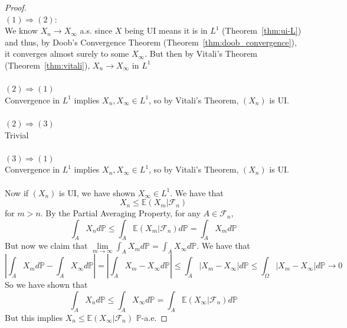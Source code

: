 \documentclass[11pt,a4paper]{article}
\theoremstyle{definition}
\begin{document}
\begin{proof}
~\\ $(1) \Longrightarrow (2)$: ~\\
    We know $X_n \to X_\infty$ a.s. since $X$ being UI means it is in $L^1$ (Theorem~\ref{thm:ui-L}) and thus, by Doob's Convergence Theorem (Theorem~\ref{thm:doob_convergence}), it converges almost surely to some $X_\infty$. But then by Vitali's Theorem (Theorem~\ref{thm:vitali}), $X_n \to X_\infty$ in $L^1$
    ~\\~\\ $(2) \Longrightarrow (1)$ ~\\
    Convergence in $L^1$ implies $X_n, X_\infty \in L^1$, so by Vitali's Theorem, $(X_n)$ is UI.
    ~\\~\\ $(2) \Longrightarrow (3)$ ~\\
    Trivial
    ~\\~\\ $(3) \Longrightarrow (1)$ ~\\
    Convergence in $L^1$ implies $X_n, X_\infty \in L^1$, so by Vitali's Theorem, $(X_n)$ is UI.
    ~\\~\\ Now if $(X_n)$ is UI, we have shown $X_\infty \in L^1$. We have that \[
    X_n \le \mathbb{E}(X_m | \mathcal{F}_n)
    \] for $m > n$. By the Partial Averaging Property, for any $A \in \mathcal{F}_n$, \[
    \int _A X_n d\mathbb{P} \le \int _A \mathbb{E}(X_m | \mathcal{F}_n)d\mathbb{P} = \int _A X_m d\mathbb{P}
    \]
    But now we claim that $\lim \limits _{m \to \infty} \int _A X_m d\mathbb{P} = \int _A X_\infty d\mathbb{P}$. We have that \[
    \left | \int _A X_m d\mathbb{P} -  \int _A X_\infty d\mathbb{P}  \right | = \left | \int _A X_m - X_\infty d\mathbb{P} \right | \le \int _A |X_m - X_\infty |d\mathbb{P} \le \int _\Omega |X_m - X_\infty |d\mathbb{P} \to 0
    \]
    So we have shown that \[
    \int _A X_n d\mathbb{P} \le \int _A X_\infty d\mathbb{P} = \int _A \mathbb{E} (X_\infty |\mathcal{F}_n) d\mathbb{P}
    \]
    But this implies $X_n \le \mathbb{E} (X_\infty | \mathcal{F}_n )$ $\mathbb{P}$-a.e.
\end{proof}
\end{document}
